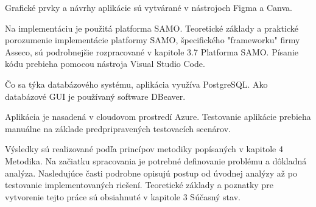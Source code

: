 Grafické prvky a návrhy aplikácie sú vytvárané v nástrojoch Figma a Canva.

Na implementáciu je použitá platforma SAMO. Teoretické základy a praktické porozumenie implementácie platformy SAMO, špecifického "frameworku" firmy Asseco, sú podrobnejšie rozpracované v kapitole 3.7 Platforma SAMO. Písanie kódu prebieha pomocou nástroja Visual Studio Code.

Čo sa týka databázového systému, aplikácia využíva PostgreSQL. Ako databázové GUI je používaný software DBeaver.

Aplikácia je nasadená v cloudovom prostredí Azure. Testovanie aplikácie prebieha manuálne na základe predpripravených testovacích scenárov.


%




%
%
%
%
%
%

Výsledky sú realizované podľa princípov metodiky popísaných v kapitole 4 Metodika. Na začiatku spracovania je potrebné definovanie problému a dôkladná analýza. Nasledujúce časti podrobne opisujú postup od úvodnej analýzy až po testovanie implementovaných riešení. Teoretické základy a poznatky pre vytvorenie tejto práce sú obsiahnuté v kapitole 3 Súčasný stav.

